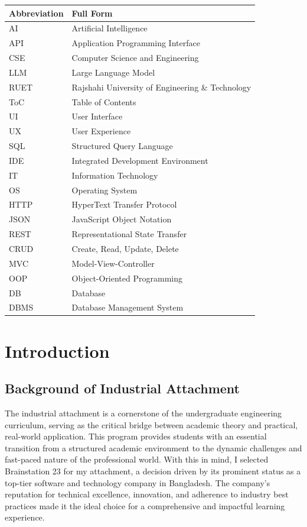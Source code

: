 \documentclass[12pt,a4paper]{article}
\begin{document}
\begin{tabular}{@{}ll@{}}
\toprule
\textbf{Abbreviation} & \textbf{Full Form} \\
\midrule
AI & Artificial Intelligence \\
API & Application Programming Interface \\
CSE & Computer Science and Engineering \\
LLM & Large Language Model \\
RUET & Rajshahi University of Engineering \& Technology \\
ToC & Table of Contents \\
UI & User Interface \\
UX & User Experience \\
SQL & Structured Query Language \\
IDE & Integrated Development Environment \\
IT & Information Technology \\
OS & Operating System \\
HTTP & HyperText Transfer Protocol \\
JSON & JavaScript Object Notation \\
REST & Representational State Transfer \\
CRUD & Create, Read, Update, Delete \\
MVC & Model-View-Controller \\
OOP & Object-Oriented Programming \\
DB & Database \\
DBMS & Database Management System \\
\bottomrule
\end{tabular}

\newpage
{} %
\setcounter{page}{1} %




\section{Introduction}

\subsection{Background of Industrial Attachment}
The industrial attachment is a cornerstone of the undergraduate engineering curriculum, serving as the critical bridge between academic theory and practical, real-world application. This program provides students with an essential transition from a structured academic environment to the dynamic challenges and fast-paced nature of the professional world. With this in mind, I selected Brainstation 23 for my attachment, a decision driven by its prominent status as a top-tier software and technology company in Bangladesh. The company's reputation for technical excellence, innovation, and adherence to industry best practices made it the ideal choice for a comprehensive and impactful learning experience.
\end{document}
